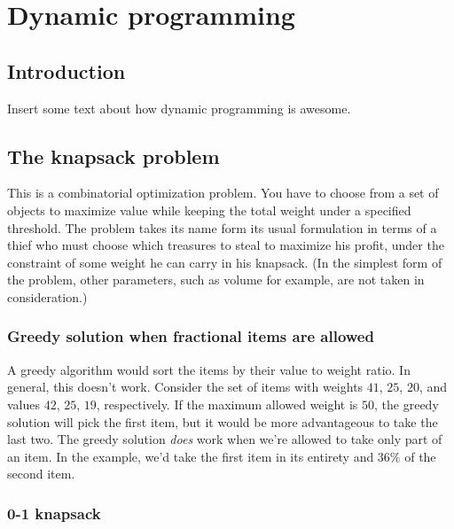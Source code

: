 \documentclass[a4paper,12pt]{article}
\begin{document}
\newpage\section{Dynamic programming}

\subsection{Introduction}

Insert some text about how dynamic programming is awesome.

\subsection{The knapsack problem}

This is a combinatorial optimization problem. You have to choose from a set of objects to maximize value while keeping the total weight under a specified threshold. The problem takes its name form its usual formulation in terms of a thief who must choose which treasures to steal to maximize his profit, under the constraint of some weight he can carry in his knapsack. (In the simplest form of the problem, other parameters, such as volume for example, are not taken in consideration.)

\subsubsection{Greedy solution when fractional items are allowed}

A greedy algorithm would sort the items by their value to weight ratio. In general, this doesn't work. Consider the set of items with weights $41$, $25$, $20$, and values $42$, $25$, $19$, respectively. If the maximum allowed weight is $50$, the greedy solution will pick the first item, but it would be more advantageous to take the last two. The greedy solution {\em does} work when we're allowed to take only part of an item. In the example, we'd take the first item in its entirety and $36\%$ of the second item.

\subsubsection{0-1 knapsack}
\end{document}
